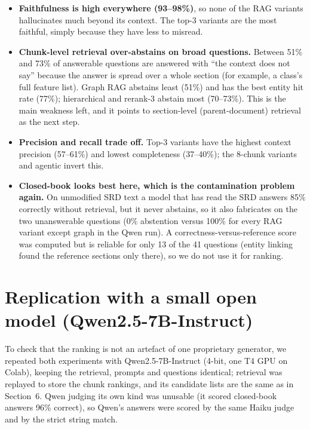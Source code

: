 \documentclass[11pt,a4paper]{article}
\begin{document}
\begin{itemize}
\item \textbf{Faithfulness is high everywhere (93--98\%)}, so none of the RAG variants hallucinates much beyond its context. The top-3 variants are the most faithful, simply because they have less to misread.
\item \textbf{Chunk-level retrieval over-abstains on broad questions.} Between 51\% and 73\% of answerable questions are answered with ``the context does not say'' because the answer is spread over a whole section (for example, a class's full feature list). Graph RAG abstains least (51\%) and has the best entity hit rate (77\%); hierarchical and rerank-3 abstain most (70--73\%). This is the main weakness left, and it points to section-level (parent-document) retrieval as the next step.
\item \textbf{Precision and recall trade off.} Top-3 variants have the highest context precision (57--61\%) and lowest completeness (37--40\%); the 8-chunk variants and agentic invert this.
\item \textbf{Closed-book looks best here, which is the contamination problem again.} On unmodified SRD text a model that has read the SRD answers 85\% correctly without retrieval, but it never abstains, so it also fabricates on the two unanswerable questions (0\% abstention versus 100\% for every RAG variant except graph in the Qwen run). A correctness-versus-reference score was computed but is reliable for only 13 of the 41 questions (entity linking found the reference sections only there), so we do not use it for ranking.
\end{itemize}

\section{Replication with a small open model (Qwen2.5-7B-Instruct)}
To check that the ranking is not an artefact of one proprietary generator, we repeated both experiments with Qwen2.5-7B-Instruct (4-bit, one T4 GPU on Colab), keeping the retrieval, prompts and questions identical; retrieval was replayed to store the chunk rankings, and its candidate lists are the same as in Section~6. Qwen judging its own kind was unusable (it scored closed-book answers 96\% correct), so Qwen's answers were scored by the same Haiku judge and by the strict string match.
\end{document}

